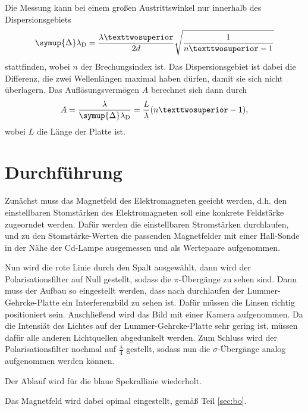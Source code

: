 Die Messung kann bei einem großen Austrittswinkel nur innerhalb des Dispersionsgebiets
\begin{equation}
  \symup{\Delta}\lambda_{\si{D}} = \frac{\lambda²}{2 d} \sqrt{\frac{1}{n²-1}}
  \label{eqn:lD}
\end{equation}
stattfinden, wobei $n$ der Brechungsindex ist. Das Dispersionsgebiet ist dabei die Differenz, die zwei Wellenlängen 
maximal haben dürfen, damit sie sich nicht überlagern.
Das Auflösungsvermögen $A$ berechnet sich dann durch
\begin{equation}
  A = \frac{\lambda}{\symup{\Delta}\lambda_{\si{D}}} = \frac{L}{\lambda} (n²-1),
  \label{eqn:A}
\end{equation} 
wobei $L$ die Länge der Platte ist. 



\section{Durchführung}
\label{sec:Durchführung}

Zunächst muss das Magnetfeld des Elektromagneten geeicht werden, d.h. den einstellbaren Stomstärken des 
Elektromagneten soll eine konkrete Feldstärke zugeorndet werden. Dafür werden die einstellbaren Stromstärken
durchlaufen, und zu den Stomstärke-Werten die passenden Magnetfelder mit einer Hall-Sonde in der Nähe der 
Cd-Lampe ausgemessen und als Wertepaare aufgenommen. 

Nun wird die rote Linie durch den Spalt ausgewählt, dann wird der Polarisationsfilter auf Null gestellt, 
sodass die $\pi$-Übergänge zu sehen sind.
Dann muss der Aufbau so eingestellt werden, dass nach durchlaufen der Lummer-Gehrcke-Platte ein Interferenzbild 
zu sehen ist. Dafür müssen die Linsen richtig positioniert sein. %
Anschließend wird das Bild mit einer Kamera aufgenommen. Da die Intensiät des Lichtes auf der Lummer-Gehrcke-Platte 
sehr gering ist, müssen dafür alle anderen Lichtquellen abgedunkelt werden. 
Zum Schluss wird der Polarisationsfilter nochmal auf $\frac{\lambda}{4}$ gestellt, 
sodass nun die $\sigma$-Übergänge analog aufgenommen werden können. 

Der Ablauf wird für die blaue Spekrallinie wiederholt.

Das Magnetfeld wird dabei opimal eingestellt, gemäß Teil \ref{sec:bo}.